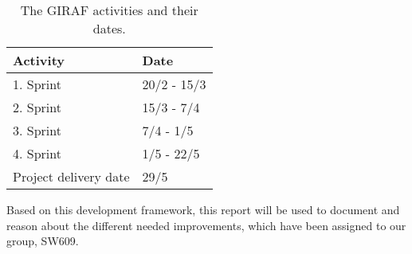 \begin{table}[H]
\centering
\begin{tabular}{|l|l|}
\hline
Activity & Date \\ \hline
1. Sprint & 20/2 - 15/3 \\\hline 
2. Sprint & 15/3 - 7/4\\\hline 
3. Sprint & 7/4 - 1/5\\\hline 
4. Sprint & 1/5 - 22/5\\\hline 
Project delivery date & 29/5\\\hline
\end{tabular}
\caption{The GIRAF activities and their dates.}
\label{TableActivity}
\end{table}

Based on this development framework, this report will be used to document and
reason about the different needed improvements, which have been assigned to our
group, SW609.

